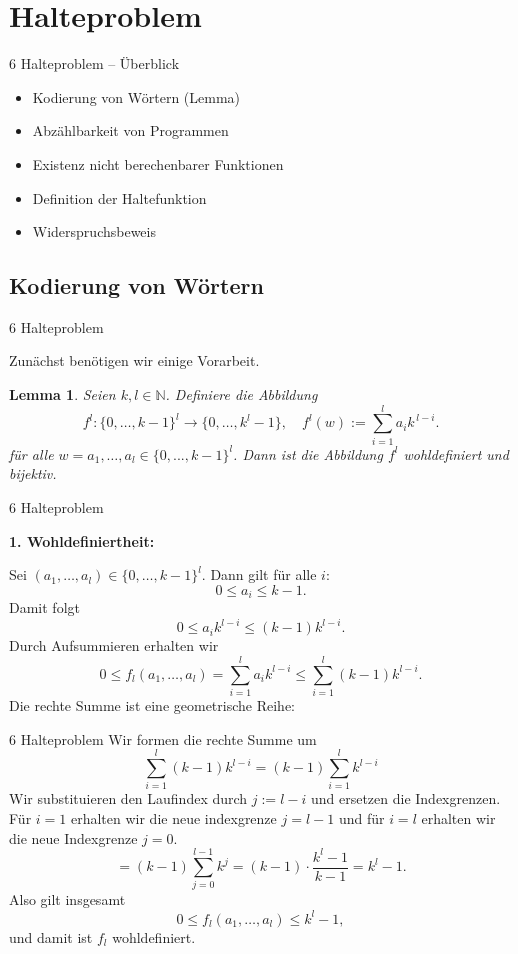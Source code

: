\documentclass{beamer}
\newcommand{\beweis}[1]{\textbf{\structure{Beweis~#1.}}}
\newtheorem{lem}[thm]{Lemma}
\begin{document}
\section{Halteproblem}
\begin{frame}{6 Halteproblem – Überblick}
\begin{itemize}
    \item Kodierung von Wörtern (Lemma)
    \item Abzählbarkeit von Programmen
    \item Existenz nicht berechenbarer Funktionen
    \item Definition der Haltefunktion
    \item Widerspruchsbeweis
\end{itemize}
\end{frame}

   \subsection{Kodierung von Wörtern}
\begin{frame}{6 Halteproblem}

    Zunächst benötigen wir einige Vorarbeit.

    \begin{lem}
    Seien $k,l \in \mathbb{N}$. Definiere die Abbildung
    \[ 
    f^l: \{0,\dots,k-1\}^l \to \{0,\dots,k^l-1\}, \quad
    f^l(w) := \sum_{i=1}^{l} a_i k^{\,l-i}.
    \]
   für alle \( w = a_1,\dots,a_l \in \{0,...,k-1\}^l \).
    Dann ist die Abbildung $f^l$ wohldefiniert und bijektiv.
\end{lem}
\end{frame}

\begin{frame}{6  Halteproblem}

\beweis{2}

    \textbf{1. Wohldefiniertheit:}

Sei $(a_1,\dots,a_l) \in \{0,\dots,k-1\}^l$. Dann gilt für alle $i$:
\[
0 \le a_i \le k-1.
\]
Damit folgt
\[
0 \le a_i k^{l-i} \le (k-1)k^{l-i}.
\]
Durch Aufsummieren erhalten wir
\[
0 \le f_l(a_1,\dots,a_l) = \sum_{i=1}^l a_i k^{l-i}
\le \sum_{i=1}^l (k-1)k^{l-i}.
\]
Die rechte Summe ist eine geometrische Reihe:

\end{frame}

\begin{frame}{6 Halteproblem}
Wir formen die rechte Summe um
\[
\sum_{i=1}^l (k-1)k^{l-i}
= (k-1)\sum_{i=1}^l{k^{l-i}}
\]
Wir substituieren den Laufindex durch $j:=l-i$ und ersetzen die Indexgrenzen. Für $i=1$ erhalten wir die neue indexgrenze $j=l-1$ und für $i=l$ erhalten wir die neue Indexgrenze $j=0$.
\[= (k-1)\sum_{j=0}^{l-1} k^j
= (k-1)\cdot \frac{k^l - 1}{k-1}
= k^l - 1.
\]
    Also gilt insgesamt
\[
0 \le f_l(a_1,\dots,a_l) \le k^l - 1,
\]
und damit ist $f_l$ wohldefiniert.
\end{frame}
\end{document}
